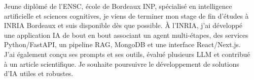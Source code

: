 
\begin{cvparagraph}
Jeune diplômé de l’ENSC, école de Bordeaux INP, spécialisé en intelligence artificielle et sciences cognitives, je viens de terminer mon stage de fin d’études à INRIA Bordeaux et suis disponible dès que possible. À l’INRIA, j’ai développé une application IA de bout en bout associant un agent multi-étapes, des services Python/FastAPI, un pipeline RAG, MongoDB et une interface React/Next.js. J’ai également conçu ses prompts et ses outils, évalué plusieurs LLM et contribué à un article scientifique. Je souhaite poursuivre le développement de solutions d’IA utiles et robustes.
\end{cvparagraph}
